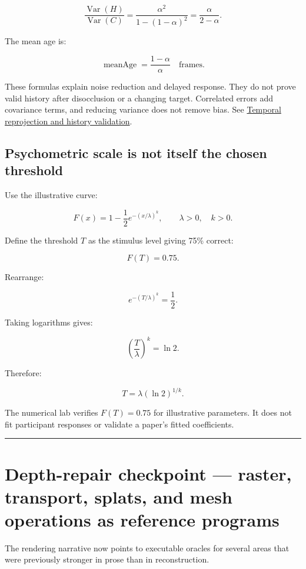 \[
\frac{\operatorname{Var}(H)}{\operatorname{Var}(C)}
=\frac{\alpha^2}{1-(1-\alpha)^2}
=\frac{\alpha}{2-\alpha}.
\]

The mean age is:

\[
\operatorname{meanAge}=\frac{1-\alpha}{\alpha}
\quad\text{frames}.
\]

These formulas explain noise reduction and delayed response. They do not prove valid history after disocclusion or a changing target. Correlated errors add covariance terms, and reducing variance does not remove bias. See \hyperref[appendix-0727340a4428]{Temporal reprojection and history validation}.

\subsection{Psychometric scale is not itself the chosen threshold}\label{04-visual-computing-ii-ch043-psychometric-scale-is-not-itself-the-chosen-threshold}

Use the illustrative curve:

\[
F(x)=1-\frac12e^{-(x/\lambda)^k},
\qquad \lambda>0,\quad k>0.
\]

Define the threshold \(T\) as the stimulus level giving 75\% correct:

\[
F(T)=0.75.
\]

Rearrange:

\[
e^{-(T/\lambda)^k}=\frac12.
\]

Taking logarithms gives:

\[
\left(\frac{T}{\lambda}\right)^k=\ln2.
\]

Therefore:

\[
T=\lambda(\ln2)^{1/k}.
\]

The numerical lab verifies \(F(T)=0.75\) for illustrative parameters. It does not fit participant responses or validate a paper's fitted coefficients.

\begin{center}\rule{0.5\linewidth}{0.5pt}\end{center}

\section{Depth-repair checkpoint --- raster, transport, splats, and mesh operations as reference programs}\label{04-visual-computing-ii-ch043-depth-repair-checkpoint-raster-transport-splats-and-mesh-operations-as-reference-programs}

The rendering narrative now points to executable oracles for several areas that were previously stronger in prose than in reconstruction.

